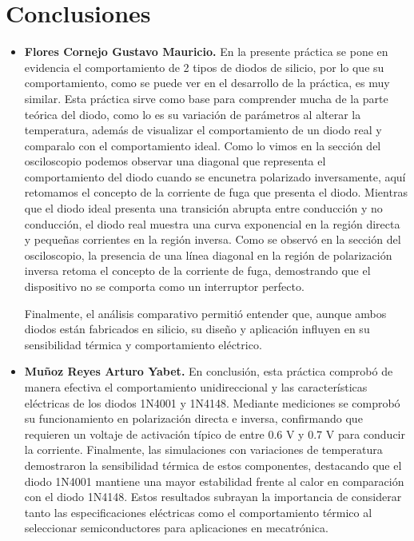 \documentclass[journal]{IEEEtran}
\begin{document}
\section{Conclusiones}
\begin{itemize}
    \item \textbf{Flores Cornejo Gustavo Mauricio.}
    \newline En la presente práctica se pone en evidencia el comportamiento de 2 tipos de diodos de silicio, por lo que su comportamiento, como se puede ver en el desarrollo de la 
    práctica, es muy similar. Esta práctica sirve como base para comprender mucha de la parte teórica del diodo, como lo es su variación de parámetros al alterar la temperatura, además de visualizar el comportamiento de un diodo 
    real y comparalo con el comportamiento ideal. Como lo vimos en la sección del osciloscopio podemos observar una diagonal que representa el comportamiento del diodo cuando se encunetra polarizado inversamente, aquí retomamos el concepto 
    de la corriente de fuga que presenta el diodo. Mientras que el diodo ideal presenta una transición abrupta entre conducción y no conducción, el diodo real muestra una curva exponencial en la región directa y pequeñas corrientes en la región inversa. Como se observó en la sección del osciloscopio, la presencia de una línea diagonal en la región de polarización inversa retoma el concepto de la corriente de fuga, demostrando que el dispositivo no se comporta como un interruptor perfecto.

Finalmente, el análisis comparativo permitió entender que, aunque ambos diodos están fabricados en silicio, su diseño y aplicación influyen en su sensibilidad térmica y comportamiento eléctrico.
    
    \item \textbf{Muñoz Reyes Arturo Yabet.}
    \newline En conclusión, esta práctica comprobó de manera efectiva el comportamiento unidireccional y las características eléctricas de los diodos 1N4001 y 1N4148. Mediante mediciones se comprobó su funcionamiento en polarización directa e inversa, confirmando 
    que requieren un voltaje de activación típico de entre 0.6 V y 0.7 V para conducir la corriente. Finalmente, las simulaciones con variaciones de temperatura demostraron la sensibilidad térmica de estos componentes, destacando que el diodo  1N4001 mantiene una 
    mayor estabilidad frente al calor en comparación con el diodo 1N4148. Estos resultados subrayan la importancia de considerar tanto las especificaciones eléctricas como el comportamiento térmico al seleccionar semiconductores para aplicaciones en mecatrónica.


\end{itemize}
\end{document}
